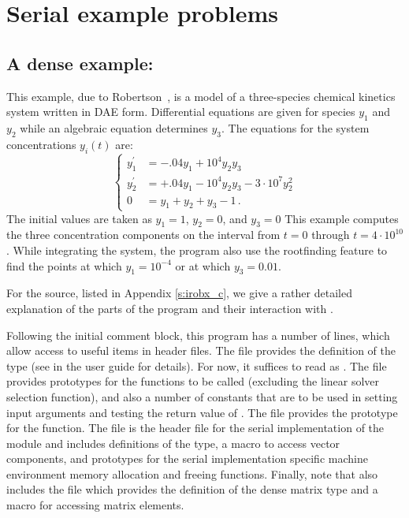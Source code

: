 \section{Serial example problems}\label{s:ex_serial}

\subsection{A dense example: }\label{ss:irobx}

This example, due to Robertson~\cite{Rob:66}, is a model of a three-species 
chemical kinetics system written in DAE form. Differential equations are given 
for species $y_1$ and $y_2$ while an algebraic equation determines $y_3$. The 
equations for the system concentrations $y_i(t)$ are:
\begin{equation}\label{e:irobx_DAE}
\begin{cases}
  y^\prime_1 &= -.04 y_1 + 10^4 y_2 y_3   \\
  y^\prime_2 &= +.04 y_1 - 10^4 y_2 y_3 - 3 \cdot 10^7 y_2^2  \\
  0 &=  y_1 + y_2 + y_3 - 1 \, .
\end{cases}
\end{equation}
The initial values are taken as $y_1 = 1$, $y_2 = 0$, and $y_3 = 0$
This example computes the three concentration components on the interval
from $t=0$ through $t=4 \cdot 10^{10}$.
While integrating the system, the program also use the rootfinding
feature to find the points at which $y_1 = 10^{-4}$ or at which
$y_3 = 0.01$.

For the source, listed in Appendix \ref{s:irobx_c}, we give a rather detailed
explanation of the parts of the program and their interaction with {\ida}.

Following the initial comment block, this program has a number
of  lines, which allow access to useful items in {\ida}
header files.  The  file provides the definition of the
type  (see  in the user guide \cite{ida2.2.0_ug}
for details).  For now, it suffices to read  as .
The  file provides prototypes for the {\ida}
functions to be called (excluding the linear solver selection
function), and also a number of constants that are to be used in
setting input arguments and testing the return value of .
The  file provides the prototype for the  function.
The  file is the header file for the serial
implementation of the {\nvector} module and includes definitions of the 
 type, a macro to access vector components, and prototypes 
for the serial implementation specific machine environment memory allocation
and freeing functions.
Finally, note that  also includes the  file which 
provides the definition of the dense matrix type  and a macro for 
accessing matrix elements.

